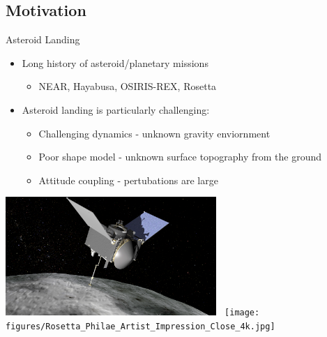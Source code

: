 \documentclass[11pt,professionalfonts]{beamer}
\begin{document}
\subsection*{Motivation}  
\begin{frame}{Asteroid Landing}
    \begin{itemize}
        \item Long history of asteroid/planetary missions
            \begin{itemize}
                \item NEAR, Hayabusa, OSIRIS-REX, Rosetta
            \end{itemize}
            \pause
        \item Asteroid landing is particularly challenging:
            \begin{itemize}
                \item<3-> Challenging dynamics - unknown gravity enviornment
                \item<4-> Poor shape model - unknown surface topography from the ground
                \item<5-> Attitude coupling - pertubations are large 
            \end{itemize}
    \end{itemize}
    \begin{center}
        \includegraphics[width=0.6\textwidth,height=0.4\textheight,keepaspectratio]{figures/osiris_rex.png}~
        \texttt{[image: figures/Rosetta\_Philae\_Artist\_Impression\_Close\_4k.jpg]}
    \end{center} 
\end{frame}
\end{document}
